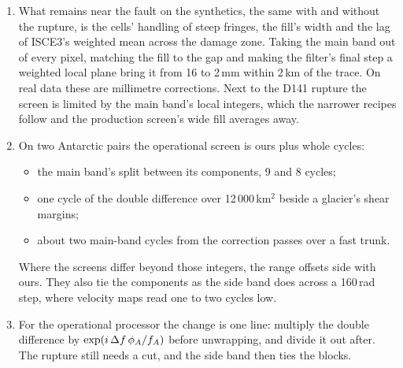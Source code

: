 \begin{enumerate}
        integer is known. On three Panama pairs it finds the pipelines' range-offset ties a cycle short. Read with the same
        estimator, the offsets agree with it: the pipelines' far-field planes were at fault, not the offsets. Ionospheric waves, and
        local cycle errors in a third of the cells beside the gap, bias it by a few tenths of a cycle; two estimators
        that fail differently, a polynomial and kriging, check each other.
  \item What remains near the fault on the synthetics, the same with and without the rupture, is the cells' handling of
        steep fringes, the fill's width and the lag of ISCE3's weighted mean across the damage zone. Taking the main
        band out of every pixel, matching the fill to the gap and making the filter's final step a weighted local
        plane bring it from 16 to 2\,mm within 2\,km of the trace. On real data these are millimetre corrections.
        Next to the D141 rupture the screen is limited by the main band's local integers, which the narrower recipes
        follow and the production screen's wide fill averages away.
  \item On two Antarctic pairs the operational screen is ours plus whole cycles:
        \begin{itemize}
          \item the main band's split between its components, 9 and 8 cycles;
          \item one cycle of the double difference over 12\,000\,km$^2$ beside a glacier's shear margins;
          \item about two main-band cycles from the correction passes over a fast trunk.
        \end{itemize}
        Where the screens differ beyond those integers, the range offsets side with ours. They also tie the components as
        the side band does across a 160\,rad step, where velocity maps read one to two cycles low.
  \item For the operational processor the change is one line: multiply the double difference by
        $\exp(i\,\Delta f\,\phi_A/f_A)$ before unwrapping, and divide it out after. The rupture still needs a cut, and
        the side band then ties the blocks.
\end{enumerate}
